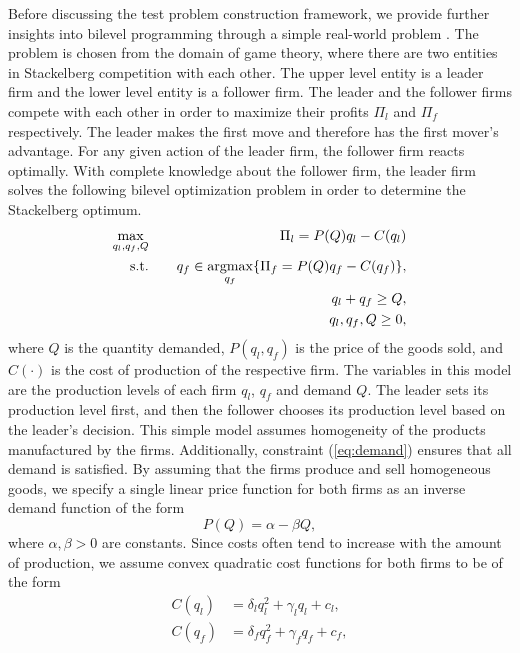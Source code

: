 \documentclass[twoside]{article}
\def\argmax{\mathop{\rm argmax}\limits}
\begin{document}
Before discussing the test problem construction framework, we provide further insights into bilevel programming through a simple real-world problem \citep{my-caor13,my-ifac12}. The problem is chosen from the domain of game theory, where there are two entities in Stackelberg competition with each other. The upper level entity is a leader firm and the lower level entity is a follower firm. The leader and the follower firms compete with each other in order to maximize their profits $\Pi_{l}$ and $\Pi_{f}$ respectively. The leader makes the first move and therefore has the first mover's advantage. For any given action of the leader firm, the follower firm reacts optimally. 
With complete knowledge about the follower firm, the leader firm solves the following bilevel optimization problem in order to determine the Stackelberg optimum.
\begin{eqnarray} \label{eq:simple}
	\max_{q_l,q_f,Q} \quad&& \Pi_l = P(Q) q_l - C(q_l) \\
	\mbox{s.t.} \quad&& q_f \in \argmax_{q_f} \lbrace {\Pi_f = P(Q) q_f - C(q_f)} \rbrace , \\
	&& q_l + q_f \geq Q , \label{eq:demand}\\
	&& q_l, q_f, Q \geq 0 ,
\end{eqnarray}
where $Q$ is the quantity demanded, $P(q_l,q_f)$ is the price of the goods sold, and $C(\cdot)$ is the cost of production of the respective firm. The variables in this model are the production levels of each firm $q_l$, $q_f$ and demand $Q$. The leader sets its production level first, and then the follower chooses its production level based on the leader's decision. This simple model assumes homogeneity of the products manufactured by the firms. Additionally, constraint (\ref{eq:demand}) ensures that all demand is satisfied.
By assuming that the firms produce and sell homogeneous goods, we specify a single linear price function for both firms as an inverse demand function of the form
\begin{equation} \label{eq:simpleprice}
	P(Q) = \alpha - \beta Q ,
\end{equation}
where $\alpha, \beta > 0$ are constants. Since costs often tend to increase with the amount of production, we assume convex quadratic cost functions for both firms to be of the form
\begin{align} \label{eq:simplecosts}
	C(q_l) & = \delta_l q_l^2 + \gamma_l q_l + c_l, \\
	C(q_f) & = \delta_f q_f^2 + \gamma_f q_f + c_f,
\end{align}
\end{document}
